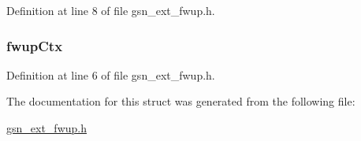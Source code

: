 Definition at line 8 of file gsn\_\-ext\_\-fwup.h.

\hypertarget{a00072_aa806318462a01e08d5ef5ebe481d2b4a}{
\subsubsection[{fwupCtx}]{ {\bf fwupCtx}}}
\label{a00072_aa806318462a01e08d5ef5ebe481d2b4a}


Definition at line 6 of file gsn\_\-ext\_\-fwup.h.



The documentation for this struct was generated from the following file:\begin{DoxyCompactItemize}
\item 
\hyperlink{a00498}{gsn\_\-ext\_\-fwup.h}\end{DoxyCompactItemize}
